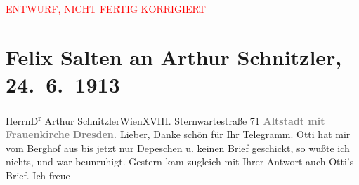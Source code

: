 
\begin{center}
            \textcolor{red}{ENTWURF, NICHT FERTIG KORRIGIERT}
                      \end{center}
            
         
         \renewcommand{\erwaehntePersonen}{Personen: Ottilie Salten, Heinrich Schnitzler, Olga Schnitzler, Lili Schnitzler}
         \renewcommand{\erwaehnteOrte}{Orte: Berghof, Dresden, Frauenkirche, Sternwartestraße, Wien}
         \renewcommand{\erwaehnteWerke}{}
               \section[Felix Salten an Arthur Schnitzler, 24. 6. 1913]{ Felix Salten an Arthur Schnitzler, 24. 6. 1913}\nopagebreak{}\rehead{ }\begin{ledgroupsized}[t]{13cm}\normalsize\beginnumbering \toendnotes[C]{\smallbreak\pagebreak[2]} 
\toendnotes[C]{\smallbreak}\pstart{}{\pb}Herrn\pend{}\pstart{}D\textsuperscript{r} Arthur Schnitzler\pend{}\pstart{}Wien\pend{}\pstart{}XVIII. Sternwartestraße 71\pend{}{\bigskip}\pstart
           \noindent{}\centering{}{\pb}\textcolor{gray}{\textbf{Altstadt mit Frauenkirche}}\pend
           \pstart
           \noindent{}\textcolor{gray}{\textbf{Dresden.}}\pend
           \pstart{}{\pb}Lieber,\pend\pstart
           Danke schön für Ihr Telegramm. Otti hat mir
               vom Berghof aus bis jetzt nur Depeschen u. keinen
               Brief geschickt, so wußte ich nichts, und war beunruhigt. Gestern kam zugleich mit
               Ihrer Antwort auch Otti’s Brief. Ich freue

\end{ledgroupsized}
